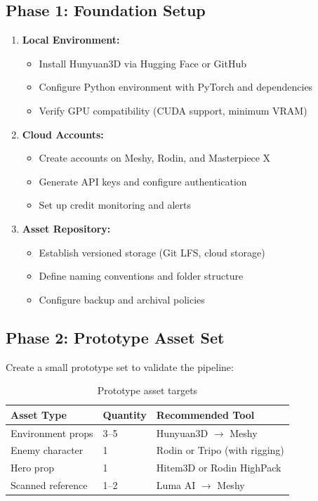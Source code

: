 \documentclass[11pt]{article}
\begin{document}
\subsection{Phase 1: Foundation Setup}

\begin{enumerate}[leftmargin=2em]
  \item \textbf{Local Environment:}
    \begin{itemize}
      \item Install Hunyuan3D via Hugging Face or GitHub
      \item Configure Python environment with PyTorch and dependencies
      \item Verify GPU compatibility (CUDA support, minimum VRAM)
    \end{itemize}

  \item \textbf{Cloud Accounts:}
    \begin{itemize}
      \item Create accounts on Meshy, Rodin, and Masterpiece X
      \item Generate API keys and configure authentication
      \item Set up credit monitoring and alerts
    \end{itemize}

  \item \textbf{Asset Repository:}
    \begin{itemize}
      \item Establish versioned storage (Git LFS, cloud storage)
      \item Define naming conventions and folder structure
      \item Configure backup and archival policies
    \end{itemize}
\end{enumerate}

\subsection{Phase 2: Prototype Asset Set}

Create a small prototype set to validate the pipeline:

\begin{table}[H]
\centering
\small
\begin{tabular}{@{}l l l@{}}
\toprule
\textbf{Asset Type} & \textbf{Quantity} & \textbf{Recommended Tool} \\
\midrule
Environment props & 3--5 & Hunyuan3D $\rightarrow$ Meshy \\
Enemy character & 1 & Rodin or Tripo (with rigging) \\
Hero prop & 1 & Hitem3D or Rodin HighPack \\
Scanned reference & 1--2 & Luma AI $\rightarrow$ Meshy \\
\bottomrule
\end{tabular}
\caption{Prototype asset targets}
\label{tab:prototype}
\end{table}
\end{document}
